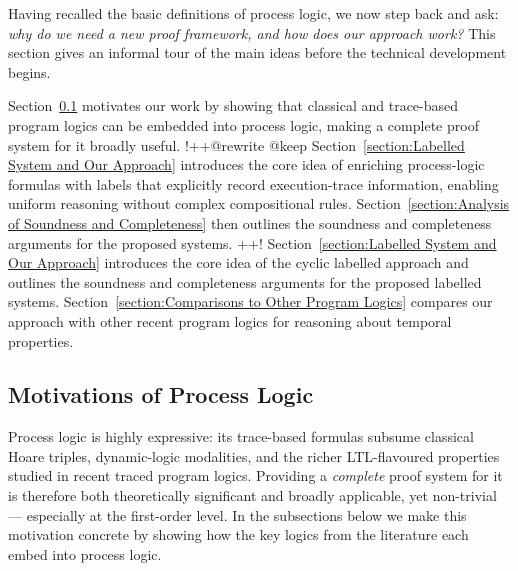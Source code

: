 \documentclass[manuscript,screen]{acmart}
\begin{document}
Having recalled the basic definitions of process logic, we now step back and ask: \emph{why do we need a new proof framework, and how does our approach work?}  This section gives an informal tour of the main ideas before the technical development begins.

Section~\ref{section:Motivations} motivates our work by showing that classical and trace-based program logics can be embedded into process logic, making a complete proof system for it broadly useful. 
\ifx
!++@rewrite @keep
Section~\ref{section:Labelled System and Our Approach} introduces the core idea of enriching process-logic formulas with labels that explicitly record execution-trace information, enabling uniform reasoning without complex compositional rules.  Section~\ref{section:Analysis of Soundness and Completeness} then outlines the soundness and completeness arguments for the proposed systems. 
++!
\fi
Section~\ref{section:Labelled System and Our Approach} introduces the core idea of the cyclic labelled approach and outlines the soundness and completeness arguments for the proposed labelled systems. 
Section~\ref{section:Comparisons to Other Program Logics} compares our approach with other recent program logics for reasoning about temporal properties. 

\subsection{Motivations of Process Logic}
\label{section:Motivations}


Process logic is highly expressive: its trace-based formulas subsume classical Hoare triples, dynamic-logic modalities, and the richer LTL-flavoured properties studied in recent traced program logics.  Providing a \emph{complete} proof system for it is therefore both theoretically significant and broadly applicable, yet non-trivial --- especially at the first-order level.  
In the subsections below we make this motivation concrete by showing how the key logics from the literature each embed into process logic. 
\end{document}
